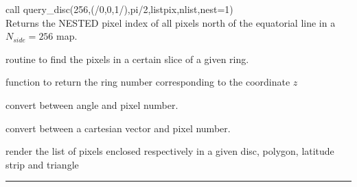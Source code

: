 \begin{example}
{
call query\_disc(256,(/0,0,1/),pi/2,listpix,nlist,nest=1)  \\
}
{
Returns the NESTED pixel index of all pixels north of the equatorial line in a $N_{side}=256$ map.
}
\end{example}
\begin{modules}
  \begin{sulist}{} %
 \item[\htmlref{in\_ring}{sub:in_ring}] routine to find the pixels in a certain slice of a given ring.		
 \item[\htmlref{ring\_num}{sub:ring_num}] function to return the ring number corresponding to the coordinate $z$
  \end{sulist}
\end{modules}

\begin{related}
  \begin{sulist}{} %
  \item[\htmlref{pix2ang}{sub:pix_tools}, \htmlref{ang2pix}{sub:pix_tools}] convert between angle and pixel number.
  \item[\htmlref{pix2vec}{sub:pix_tools}, \htmlref{vec2pix}{sub:pix_tools}] convert between a cartesian vector and pixel number.
  \item[query\_disc, \htmlref{query\_polygon}{sub:query_polygon},]
  \item[\htmlref{query\_strip}{sub:query_strip}, \htmlref{query\_triangle}{sub:query_triangle}] render the list of pixels enclosed
  respectively in a given disc, polygon, latitude strip and triangle

  \end{sulist}
\end{related}

\rule{\hsize}{2mm}

\newpage
